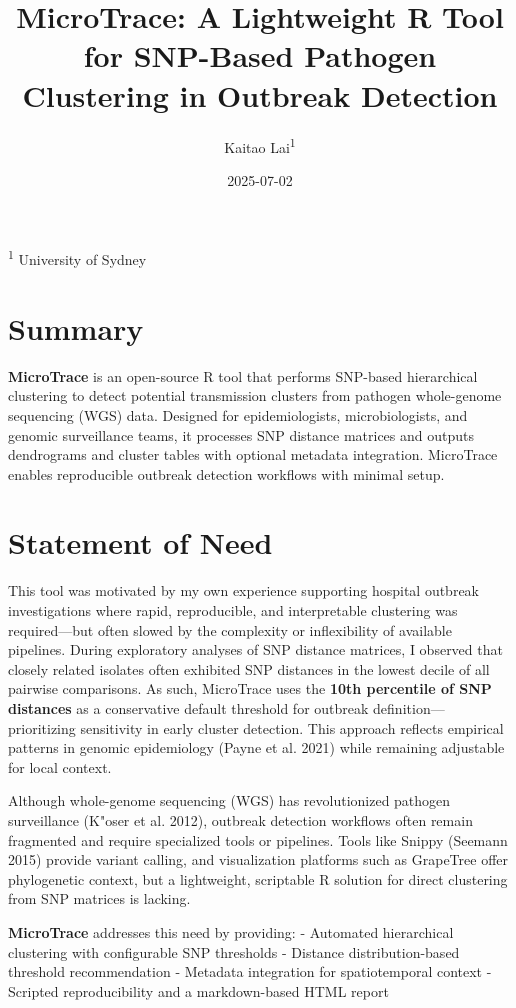 \documentclass[
]{article}
\title{MicroTrace: A Lightweight R Tool for SNP-Based Pathogen
Clustering in Outbreak Detection}
\author{Kaitao Lai\textsuperscript{1}}
\date{2025-07-02}
\begin{document}
\maketitle

\textsuperscript{1} University of Sydney

\section{Summary}\label{summary}

\textbf{MicroTrace} is an open-source R tool that performs SNP-based
hierarchical clustering to detect potential transmission clusters from
pathogen whole-genome sequencing (WGS) data. Designed for
epidemiologists, microbiologists, and genomic surveillance teams, it
processes SNP distance matrices and outputs dendrograms and cluster
tables with optional metadata integration. MicroTrace enables
reproducible outbreak detection workflows with minimal setup.

\section{Statement of Need}\label{statement-of-need}

This tool was motivated by my own experience supporting hospital
outbreak investigations where rapid, reproducible, and interpretable
clustering was required---but often slowed by the complexity or
inflexibility of available pipelines. During exploratory analyses of SNP
distance matrices, I observed that closely related isolates often
exhibited SNP distances in the lowest decile of all pairwise
comparisons. As such, MicroTrace uses the \textbf{10th percentile of SNP
distances} as a conservative default threshold for outbreak
definition---prioritizing sensitivity in early cluster detection. This
approach reflects empirical patterns in genomic epidemiology (Payne et
al. 2021) while remaining adjustable for local context.

Although whole-genome sequencing (WGS) has revolutionized pathogen
surveillance (K"oser et al. 2012), outbreak detection workflows often
remain fragmented and require specialized tools or pipelines. Tools like
Snippy (Seemann 2015) provide variant calling, and visualization
platforms such as GrapeTree offer phylogenetic context, but a
lightweight, scriptable R solution for direct clustering from SNP
matrices is lacking.

\textbf{MicroTrace} addresses this need by providing: - Automated
hierarchical clustering with configurable SNP thresholds - Distance
distribution-based threshold recommendation - Metadata integration for
spatiotemporal context - Scripted reproducibility and a markdown-based
HTML report
\end{document}

